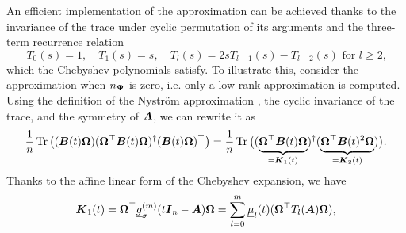 An efficient implementation of the approximation  can be achieved thanks to the invariance of the trace under cyclic permutation of its arguments and the three-term recurrence relation
\begin{equation}
    T_0(s) = 1,\quad  T_1(s) = s,\quad 
    T_l(s) = 2 s T_{l-1}(s) - T_{l-2}(s) \text{ for $l \geq 2$,}
    \label{equ:chebyshev-recurrence}
\end{equation}
which the Chebyshev polynomials satisfy. To illustrate this, consider the approximation  when $n_{\boldsymbol{\Psi}}$ is zero, i.e. only a low-rank approximation is computed. Using the definition of the Nyström approximation , the cyclic invariance of the trace, and the symmetry of $\boldsymbol{A}$, we can rewrite it as
\begin{equation}
    \frac{1}{n} \operatorname{Tr} \big((\boldsymbol{B}(t) \boldsymbol{\Omega}) (\boldsymbol{\Omega}^{\top} \boldsymbol{B}(t) \boldsymbol{\Omega})^{\dagger} (\boldsymbol{B}(t) \boldsymbol{\Omega})^{\top} \big) =
    \frac{1}{n} \operatorname{Tr} \big((\underbrace{\boldsymbol{\Omega}^{\top} \boldsymbol{B}(t) \boldsymbol{\Omega}}_{= \boldsymbol{K}_1(t)})^{\dagger} (\underbrace{\boldsymbol{\Omega}^{\top} \boldsymbol{B}(t)^2 \boldsymbol{\Omega}}_{= \boldsymbol{K}_2(t)}) \big).
    \label{equ:cyclic-property}
\end{equation}
Thanks to the affine linear form of the Chebyshev expansion, we have
\begin{equation}
    \boldsymbol{K}_1(t) = \boldsymbol{\Omega}^{\top} \underline{g}_{\sigma}^{(m)}(t \boldsymbol{I}_n - \boldsymbol{A}) \boldsymbol{\Omega} = \sum_{l=0}^{m} \underline{\mu}_l(t) (\boldsymbol{\Omega}^{\top} T_l(\boldsymbol{A}) \boldsymbol{\Omega}),
\end{equation}

